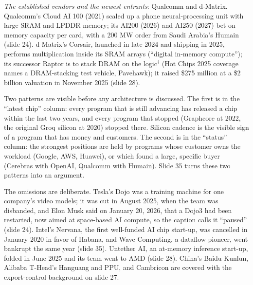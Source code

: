 \documentclass[11pt,letterpaper]{article}
\begin{document}
\emph{The established vendors and the newest entrants}: Qualcomm and d-Matrix. Qualcomm's Cloud AI 100 (2021) scaled up a phone neural-processing unit with large SRAM and LPDDR memory; its AI200 (2026) and AI250 (2027) bet on memory capacity per card, with a 200 MW order from Saudi Arabia's Humain (slide 24). d-Matrix's Corsair, launched in late 2024 and shipping in 2025, performs multiplication inside its SRAM arrays (``digital in-memory compute''); its successor Raptor is to stack DRAM on the logic$^\dagger$ (Hot Chips 2025 coverage names a DRAM-stacking test vehicle, Pavehawk); it raised \$275 million at a \$2 billion valuation in November 2025 (slide 28).

Two patterns are visible before any architecture is discussed. The first is in the ``latest chip'' column: every program that is still advancing has released a chip within the last two years, and every program that stopped (Graphcore at 2022, the original Groq silicon at 2020) stopped there. Silicon cadence is the visible sign of a program that has money and customers. The second is in the ``status'' column: the strongest positions are held by programs whose customer owns the workload (Google, AWS, Huawei), or which found a large, specific buyer (Cerebras with OpenAI, Qualcomm with Humain). Slide 35 turns these two patterns into an argument.

The omissions are deliberate. Tesla's Dojo was a training machine for one company's video models; it was cut in August 2025, when the team was disbanded, and Elon Musk said on January 20, 2026, that a Dojo3 had been restarted, now aimed at space-based AI compute, so the caption calls it ``paused'' (slide 24). Intel's Nervana, the first well-funded AI chip start-up, was cancelled in January 2020 in favor of Habana, and Wave Computing, a dataflow pioneer, went bankrupt the same year (slide 35). Untether AI, an at-memory inference start-up, folded in June 2025 and its team went to AMD (slide 28). China's Baidu Kunlun, Alibaba T-Head's Hanguang and PPU, and Cambricon are covered with the export-control background on slide 27.
\end{document}
